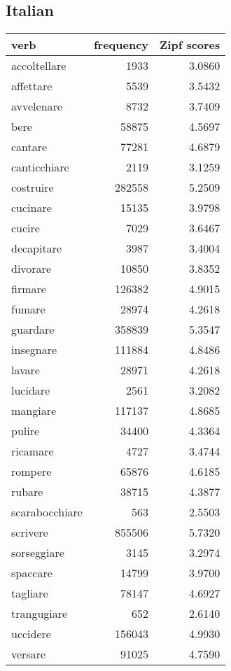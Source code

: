 \subsection{Italian}

\begin{longtable}{l|rr}
\textbf{verb}      & \textbf{frequency}    & \textbf{Zipf scores}    \\
\hline
\endhead
accoltellare   & 1933      & 3.0860     \\
affettare      & 5539      & 3.5432     \\
avvelenare     & 8732      & 3.7409     \\
bere           & 58875     & 4.5697     \\
cantare        & 77281     & 4.6879     \\
canticchiare   & 2119      & 3.1259     \\
costruire      & 282558    & 5.2509     \\
cucinare       & 15135     & 3.9798     \\
cucire         & 7029      & 3.6467     \\
decapitare     & 3987      & 3.4004     \\
divorare       & 10850     & 3.8352     \\
firmare        & 126382    & 4.9015     \\
fumare         & 28974     & 4.2618     \\
guardare       & 358839    & 5.3547     \\
insegnare      & 111884    & 4.8486     \\
lavare         & 28971     & 4.2618     \\
lucidare       & 2561      & 3.2082     \\
mangiare       & 117137    & 4.8685     \\
pulire         & 34400     & 4.3364     \\
ricamare       & 4727      & 3.4744     \\
rompere        & 65876     & 4.6185     \\
rubare         & 38715     & 4.3877     \\
scarabocchiare & 563       & 2.5503     \\
scrivere       & 855506    & 5.7320     \\
sorseggiare    & 3145      & 3.2974     \\
spaccare       & 14799     & 3.9700     \\
tagliare       & 78147     & 4.6927     \\
trangugiare    & 652       & 2.6140     \\
uccidere       & 156043    & 4.9930     \\
versare        & 91025     & 4.7590    
\end{longtable}



